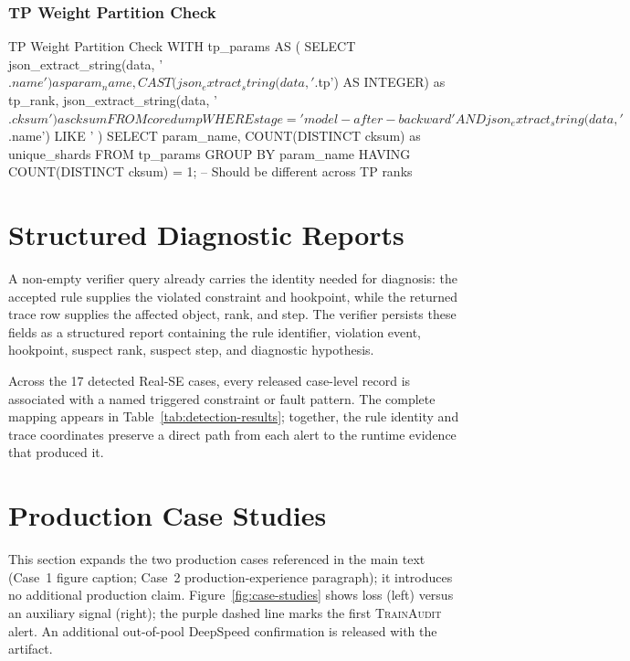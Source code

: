 \documentclass[sigconf,nonacm]{acmart}
\begin{document}
\subsubsection{TP Weight Partition Check}

\begin{sqlcode}{TP Weight Partition Check}
WITH tp_params AS (
    SELECT
        json_extract_string(data, '$.name') as param_name,
        CAST(json_extract_string(data, '$.tp') AS INTEGER) as tp_rank,
        json_extract_string(data, '$.cksum') as cksum
    FROM coredump
    WHERE stage = 'model-after-backward'
      AND json_extract_string(data, '$.name') LIKE '%
)
SELECT param_name, COUNT(DISTINCT cksum) as unique_shards
FROM tp_params
GROUP BY param_name
HAVING COUNT(DISTINCT cksum) = 1;  -- Should be different across TP ranks
\end{sqlcode}

\section{Structured Diagnostic Reports}
\label{app:diagnosis}

A non-empty verifier query already carries the identity needed for diagnosis:
the accepted rule supplies the violated constraint and hookpoint, while the
returned trace row supplies the affected object, rank, and step.  The verifier
persists these fields as a structured report containing the rule identifier,
violation event, hookpoint, suspect rank, suspect step, and diagnostic
hypothesis.

Across the 17 detected Real-SE cases, every released case-level record is
associated with a named triggered constraint or fault pattern.  The complete
mapping appears in Table~\ref{tab:detection-results}; together, the rule
identity and trace coordinates preserve a direct path from each alert to the
runtime evidence that produced it.

\section{Production Case Studies}
\label{app:production-cases}

This section expands the two production cases referenced in the main text
(Case~1 figure caption; Case~2 production-experience paragraph); it introduces
no additional production claim. Figure~\ref{fig:case-studies} shows loss (left)
versus an auxiliary signal (right); the purple dashed line marks the first
\textsc{TrainAudit} alert. An additional out-of-pool DeepSpeed confirmation is
released with the artifact.
\end{document}
